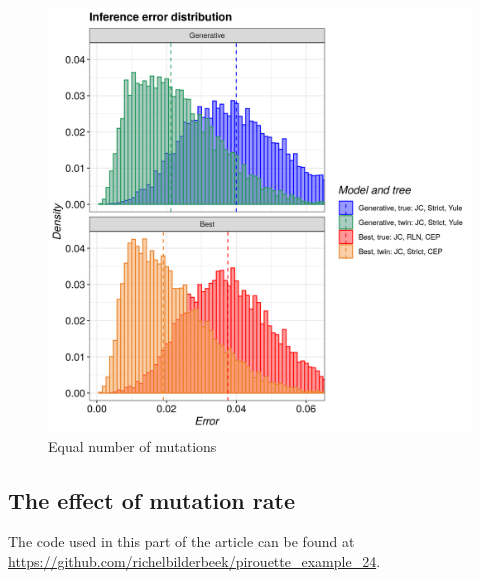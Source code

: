 \begin{figure}[H]
  \includegraphics[width=\textwidth]{pirouette_example_3/example_3_314/errors.png}
  \caption{Equal number of mutations}
\end{figure}



\subsection{The effect of mutation rate}

The code used in this part of the article can be found at 
\url{https://github.com/richelbilderbeek/pirouette_example_24}.

